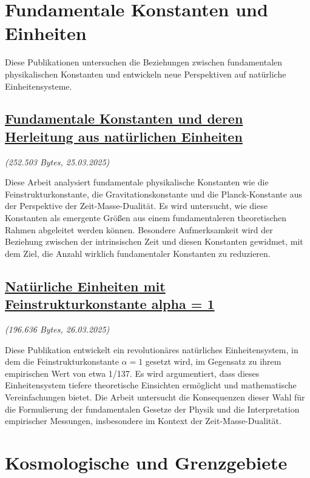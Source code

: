 \documentclass[a4paper,12pt]{article}
\newcommand{\repobase}{https://github.com/jpascher/T0-Time-Mass-Duality/tree/main/2/}
\begin{document}
	\section{Fundamentale Konstanten und Einheiten}
	
	Diese Publikationen untersuchen die Beziehungen zwischen fundamentalen physikalischen Konstanten und entwickeln neue Perspektiven auf natürliche Einheitensysteme.
	
	\subsection{\href{\repobase/pdf/Deutsch/Fundamentale Konstanten und deren Herleitung aus natürlichen Einheiten.pdf}{Fundamentale Konstanten und deren Herleitung aus natürlichen Einheiten}}
	\textit{(252.503 Bytes, 25.03.2025)}
	
	Diese Arbeit analysiert fundamentale physikalische Konstanten wie die Feinstrukturkonstante, die Gravitationskonstante und die Planck-Konstante aus der Perspektive der Zeit-Masse-Dualität. Es wird untersucht, wie diese Konstanten als emergente Größen aus einem fundamentaleren theoretischen Rahmen abgeleitet werden können. Besondere Aufmerksamkeit wird der Beziehung zwischen der intrinsischen Zeit und diesen Konstanten gewidmet, mit dem Ziel, die Anzahl wirklich fundamentaler Konstanten zu reduzieren.
	
	\subsection{\href{\repobase/pdf/Deutsch/Natürliche Einheiten mit Feinstrukturkonstante alpha = 1.pdf}{Natürliche Einheiten mit Feinstrukturkonstante alpha = 1}}
	\textit{(196.636 Bytes, 26.03.2025)}
	
	Diese Publikation entwickelt ein revolutionäres natürliches Einheitensystem, in dem die Feinstrukturkonstante $\alpha = 1$ gesetzt wird, im Gegensatz zu ihrem empirischen Wert von etwa 1/137. Es wird argumentiert, dass dieses Einheitensystem tiefere theoretische Einsichten ermöglicht und mathematische Vereinfachungen bietet. Die Arbeit untersucht die Konsequenzen dieser Wahl für die Formulierung der fundamentalen Gesetze der Physik und die Interpretation empirischer Messungen, insbesondere im Kontext der Zeit-Masse-Dualität.
	
	\section{Kosmologische und Grenzgebiete}
	
\end{document}
